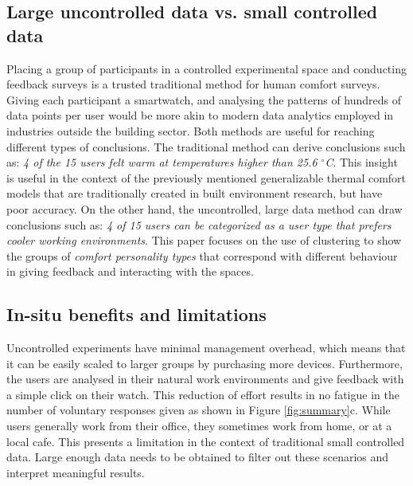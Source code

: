 
\subsection{Large uncontrolled data vs. small controlled data}



Placing a group of participants in a controlled experimental space and conducting feedback surveys is a trusted traditional method for human comfort surveys. Giving each participant a smartwatch, and analysing the patterns of hundreds of data points per user would be more akin to modern data analytics employed in industries outside the building sector. Both methods are useful for reaching different types of conclusions. The traditional method can derive conclusions such as: \emph{4 of the 15 users felt warm at temperatures higher than 25.6 $^\circ$C}. This insight is useful in the context of the previously mentioned generalizable thermal comfort models that are traditionally created in built environment research, but have poor accuracy. On the other hand, the uncontrolled, large data method can draw conclusions such as: \emph{4 of 15 users can be categorized as a user type that prefers cooler working environments}. This paper focuses on the use of clustering to show the groups of \emph{comfort personality types} that correspond with different behaviour in giving feedback and interacting with the spaces. 



\subsection{In-situ benefits and limitations}
Uncontrolled experiments have minimal management overhead, which means that it can be easily scaled to larger groups by purchasing more devices. Furthermore, the users are analysed in their natural work environments and give feedback with a simple click on their watch. This reduction of effort results in no fatigue in the number of voluntary responses given as shown in Figure \ref{fig:summary}c. While users generally work from their office, they sometimes work from home, or at a local cafe. This presents a limitation in the context of traditional small controlled data. Large enough data needs to be obtained to filter out these scenarios and interpret meaningful results.


